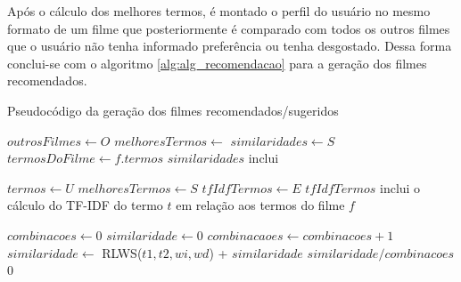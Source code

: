Após o cálculo dos melhores termos, é montado o perfil do usuário no mesmo formato de um filme que posteriormente é comparado com todos os outros filmes que o usuário não tenha informado preferência ou tenha desgostado. Dessa forma conclui-se com o algoritmo \ref{alg:alg_recomendacao} para a geração dos filmes recomendados.


\begin{algorithm}
	\caption{Pseudocódigo da geração dos filmes recomendados/sugeridos}
    \begin{algorithmic}[1]
        	\State  $outrosFilmes\gets O$
        	\State $melhoresTermos\gets$ 
        	\State $similaridades\gets S$
        		\State $termosDoFilme\gets f.termos$
        		\State $similaridades$ {inclui} 
        	\EndFor
        \EndFunction
		
		\State
            \State  $termos\gets U$
            \State  $melhoresTermos\gets S$
            \State  $tfIdfTermos\gets E$
                    \State $tfIdfTermos$ {inclui o cálculo do TF-IDF do termo $t$ em relação aos termos do filme $f$}
                \EndFor
            \EndFor
        \EndFunction
        
        \State
        	\State $combinacoes\gets 0$
        	\State $similaridade\gets 0$
        			\State $combinacaoes\gets combinacoes + 1$
        			\State $similaridade\gets$ RLWS($t1, t2, wi, wd$) + $similaridade$
        		\EndFor        	
        	\EndFor
				\Return $similaridade / combinacoes$
			\Else
				\Return $0$
			\EndIf
        \EndFunction
    \end{algorithmic}
    \label{alg:alg_recomendacao}
\end{algorithm}

